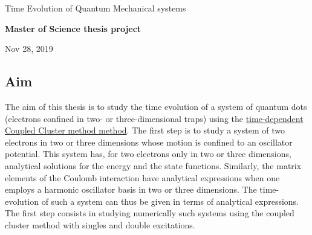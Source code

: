 \documentclass[%
oneside,                 %
final,                   %
10pt]{article}
\begin{document}

\newcommand{\exercisesection}[1]{\subsection*{#1}}






\thispagestyle{empty}

\begin{center}
{\LARGE\bf
\begin{spacing}{1.25}
Time Evolution of Quantum Mechanical systems
\end{spacing}
}
\end{center}


\begin{center}
{\bf Master of Science thesis project${}^{}$} \\ [0mm]
\end{center}

\begin{center}
\end{center}
    

\begin{center}
Nov 28, 2019
\end{center}

\vspace{1cm}


\subsection{Aim}

The aim of this thesis is to study the time evolution of a system of
quantum dots (electrons confined in two- or three-dimensional traps) using the
\href{{https://github.com/haakoek/PythonVersionMaster/tree/master/Thesis/Chapters}}{time-dependent Coupled Cluster method
method}. The
first step is to study a system of two electrons in two or three
dimensions whose motion is confined to an oscillator potential. This
system has, for two electrons only in two or three dimensions,
analytical solutions for the energy and the state
functions. Similarly, the matrix elements of the Coulomb interaction
have analytical expressions when one employs a harmonic oscillator
basis in two or three dimensions. The time-evolution of such a system
can thus be given in terms of analytical expressions. The first step
consists in studying numerically such systems using the coupled
cluster method with singles and double excitations.  
\end{document}
